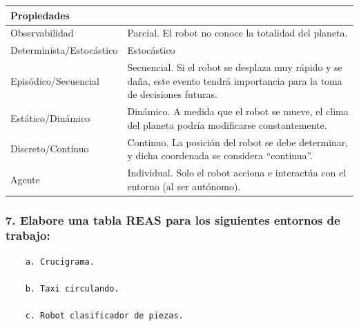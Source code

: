 \documentclass[11pt]{article}
\begin{document}
\begin{longtable}[]{@{}
  >{\raggedright\arraybackslash}p{}
  >{\raggedright\arraybackslash}p{}@{}}
\toprule\noalign{}
\begin{minipage}[b]{\linewidth}\raggedright
Propiedades
\end{minipage} & \begin{minipage}[b]{\linewidth}\raggedright
\end{minipage} \\
\midrule\noalign{}
\endhead
\bottomrule\noalign{}
\endlastfoot
Observabilidad & Parcial. El robot no conoce la totalidad del
planeta. \\
Determinista/Estocástico & Estocástico \\
Episódico/Secuencial & Secuencial. Si el robot se desplaza muy rápido y
se daña, este evento tendrá importancia para la toma de decisiones
futuras. \\
Estático/Dinámico & Dinámico. A medida que el robot se mueve, el clima
del planeta podría modificarse constantemente. \\
Discreto/Contínuo & Continuo. La posición del robot se debe determinar,
y dicha coordenada se considera ``continua''. \\
Agente & Individual. Solo el robot acciona e interactúa con el entorno
(al ser autónomo). \\
\end{longtable}

    \subsubsection{7. Elabore una tabla REAS para los siguientes entornos de
trabajo:}\label{elabore-una-tabla-reas-para-los-siguientes-entornos-de-trabajo}

\begin{verbatim}
    a. Crucigrama.

    b. Taxi circulando.

    c. Robot clasificador de piezas.
\end{verbatim}
\end{document}
